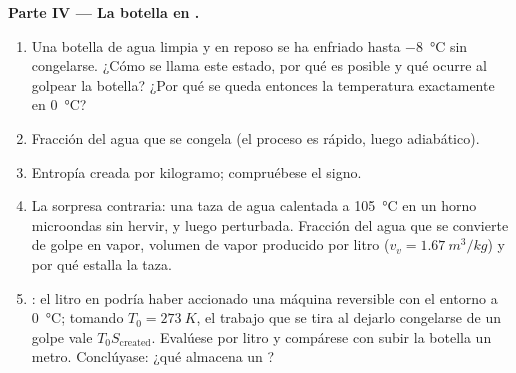 \begin{problem}
\medskip
\noindent\textbf{Parte IV --- La botella en .}
\begin{enumerate}[resume]
  \item Una botella de agua limpia y en reposo se ha enfriado hasta
        \qty{-8}{\degreeCelsius} sin congelarse. ¿Cómo se llama este estado,
        por qué es posible y qué ocurre al golpear la botella? ¿Por qué se
        queda entonces la temperatura exactamente en \qty{0}{\degreeCelsius}?
  \item Fracción del agua que se congela (el proceso es rápido, luego
        adiabático).
  \item Entropía creada por kilogramo; compruébese el signo.
  \item La sorpresa contraria: una taza de agua calentada a \qty{105}{\degreeCelsius}
        en un horno microondas sin hervir, y luego perturbada. Fracción
        del agua que se convierte de golpe en vapor, volumen de vapor
        producido por litro ($v_v = \qty{1.67}{m^3/kg}$) y por qué estalla la taza.
  \item {}: el litro en  podría haber accionado
        una máquina reversible con el entorno a \qty{0}{\degreeCelsius};
        tomando $T_0 = \qty{273}{K}$, el trabajo que se tira al dejarlo
        congelarse de un golpe vale $T_0S_{\mathrm{created}}$. Evalúese por
        litro y compárese con subir la botella un metro. Conclúyase: ¿qué
        almacena un ?
\end{enumerate}
\end{problem}
